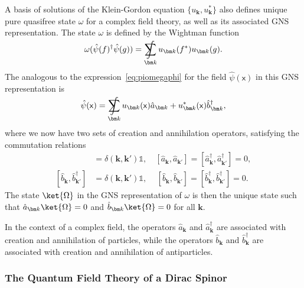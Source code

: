 \documentclass[letterpaper,12pt,titlepage,oneside,final]{book}
\newcommand{\openone}{\mathds{1}}
\newcommand{\mf}{\mathsf}%
\DeclareMathOperator*{\sumint}{%
\mathchoice%
  {\ooalign{$\displaystyle\sum$\cr\hidewidth$\displaystyle\int$\hidewidth\cr}}
  {\ooalign{\raisebox{.14\height}{\scalebox{.7}{$\textstyle\sum$}}\cr\hidewidth$\textstyle\int$\hidewidth\cr}}
  {\ooalign{\raisebox{.2\height}{\scalebox{.6}{$\scriptstyle\sum$}}\cr$\scriptstyle\int$\cr}}
  {\ooalign{\raisebox{.2\height}{\scalebox{.6}{$\scriptstyle\sum$}}\cr$\scriptstyle\int$\cr}}
}
\begin{document}
A basis of solutions of the Klein-Gordon equation $\{u_{\bm k},u_{\bm k}^*\}$ also defines unique pure quasifree state $\omega$ for a complex field theory, as well as its associated GNS representation. The state $\omega$ is defined by the Wightman function
\begin{equation}
    \omega(\hat{\psi}(f)^\dagger\hat{\psi}(g)) = \sumint_{\bm k} u_{\bm k}(f^*)u_{\bm k}(g).
\end{equation}
The analogous to the expression~\eqref{eq:piomegaphi} for the field $\hat{\psi}(\mf x)$ in this GNS representation is
\begin{equation}
    \hat{\psi}(\mf x) = \sumint_{\bm k} u_{\bm k}(\mf x) \hat{a}_{\bm k} + u_{\bm k}^*(\mf x) \hat{b}_{\bm k}^\dagger,
\end{equation}
where we now have two sets of creation and annihilation operators, satisfying the commutation relations
\begin{align}
    [\hat{a}_{\bm k},\hat{a}^\dagger_{\bm k'}] &= \delta(\bm k, \bm k')\openone, \quad 
    [\hat{a}_{\bm k},\hat{a}_{\bm k'}] = 
    [\hat{a}^\dagger_{\bm k},\hat{a}^\dagger_{\bm k'}] = 0,\\
    [\hat{b}_{\bm k},\hat{b}^\dagger_{\bm k'}] &= \delta(\bm k, \bm k')\openone, \quad \,
    [\hat{b}_{\bm k},\hat{b}_{\bm k'}] = 
    [\hat{b}^\dagger_{\bm k},\hat{b}^\dagger_{\bm k'}] = 0.
\end{align}
The state $\ket{\Omega}$ in the GNS representation of $\omega$ is then the unique state such that $\hat{a}_{\bm k}\ket{\Omega} = 0$ and $\hat{b}_{\bm k} \ket{\Omega} = 0$ for all $\bm k$.

In the context of a complex field, the operators $\hat{a}_{\bm k}$ and $\hat{a}_{\bm k}^\dagger$ are associated with creation and annihilation of particles, while the operators $\hat{b}_{\bm k}$ and $\hat{b}_{\bm k}^\dagger$ are associated with creation and annihilation of antiparticles.


\subsubsection*{The Quantum Field Theory of a Dirac Spinor}
\end{document}
